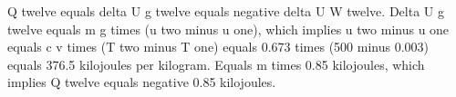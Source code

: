 Q twelve equals delta U g twelve equals negative delta U W twelve. Delta U g twelve equals m g times (u two minus u one), which implies u two minus u one equals c v times (T two minus T one) equals 0.673 times (500 minus 0.003) equals 376.5 kilojoules per kilogram. Equals m times 0.85 kilojoules, which implies Q twelve equals negative 0.85 kilojoules.